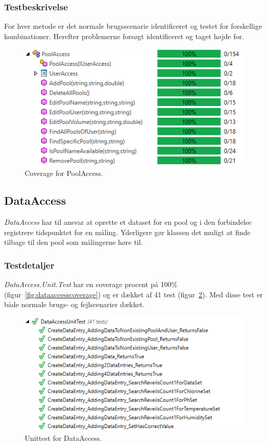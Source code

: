 \subsubsection{Testbeskrivelse}
For hver metode er det normale brugsscenarie identificeret og testet for forskellige kombinationer. Herefter problemerne forsøgt identificeret og taget højde for.

\begin{figure}[H]
	\centering
	\includegraphics[width=0.7\linewidth]{figs/test/poolaccesscoverage}
	\caption{Coverage for PoolAccess.}
	\label{fig:poolaccesscoverage}
\end{figure}

\subsection{DataAccess}
\textit{DataAccess} har til ansvar at oprette et dataset for en pool og i den forbindelse registrere tidspunktet for en måling. Yderligere gør klassen det muligt at finde tilbage til den pool som målingerne høre til.

\subsubsection{Testdetaljer}
\textit{DataAccess.Unit.Test} har en coverage procent på 100\% (figur~\ref{fig:dataaccesscoverage}) og er dækket af 41 test (figur~\ref{fig:dataaccessunittest}). Med disse test er både normale brugs- og fejlscenarier dækket.

\begin{figure}[H]
	\centering
	\includegraphics[width=0.9\linewidth]{figs/test/dataaccessunittest}
	\caption{Unittest for DataAccess.}
	\label{fig:dataaccessunittest}
\end{figure}

